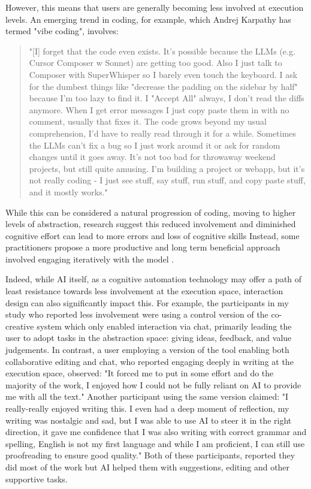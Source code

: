 However, this means that users are generally becoming less involved at execution levels. An emerging trend in coding, for example, which Andrej Karpathy has termed "vibe coding", involves: 

\begin{quote}
"[I] forget that the code even exists. It's possible because the LLMs (e.g. Cursor Composer w Sonnet) are getting too good. Also I just talk to Composer with SuperWhisper so I barely even touch the keyboard. I ask for the dumbest things like "decrease the padding on the sidebar by half" because I'm too lazy to find it. I "Accept All" always, I don't read the diffs anymore. When I get error messages I just copy paste them in with no comment, usually that fixes it. The code grows beyond my usual comprehension, I'd have to really read through it for a while. Sometimes the LLMs can't fix a bug so I just work around it or ask for random changes until it goes away. It's not too bad for throwaway weekend projects, but still quite amusing. I'm building a project or webapp, but it's not really coding - I just see stuff, say stuff, run stuff, and copy paste stuff, and it mostly works."
\end{quote}

While this can be considered a natural progression of coding, moving to higher levels of abstraction, research suggest this reduced involvement and diminished cognitive effort can lead to more errors and loss of cognitive skills \cite{Lee2025-dwL} Instead, some practitioners propose a more productive and long term beneficial approach involved engaging iteratively with the model \cite{Osmani2024-br}. 

Indeed, while AI itself, as a cognitive automation technology may offer a path of least resistance towards less involvement at the execution space, interaction design can also significantly impact this. For example, the participants in my study who reported less involvement were using a control version of the co-creative system which only enabled interaction via chat, primarily leading the user to adopt tasks in the abstraction space: giving ideas, feedback, and value judgements. In contrast, a user employing a version of the tool enabling both collaborative editing and chat, who reported engaging deeply in writing at the execution space, observed: "It forced me to put in some effort and do the majority of the work, I enjoyed how I could not be fully reliant on AI to provide me with all the text." Another participant using the same version claimed: "I really-really enjoyed writing this. I even had a deep moment of reflection, my writing was nostalgic and sad, but I was able to use AI to steer it in the right direction, it gave me confidence that I was also writing with correct grammar and spelling, English is not my first language and while I am proficient, I can still use proofreading to ensure good quality." Both of these participants, reported they did most of the work but AI helped them with suggestions, editing and other supportive tasks. 

